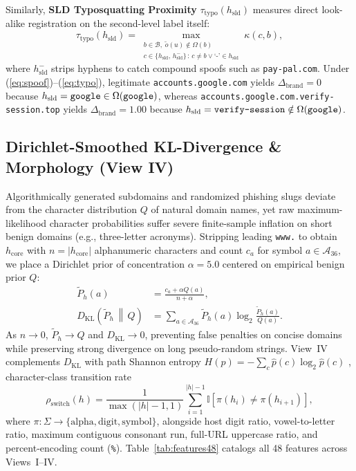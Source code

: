 \documentclass[conference]{IEEEtran}
\begin{document}
Similarly, \textbf{SLD Typosquatting Proximity} $\tau_{\text{typo}}(h_{\text{sld}})$ measures direct look-alike registration on the second-level label itself:
\begin{equation}
\tau_{\text{typo}}(h_{\text{sld}}) = \max_{\substack{b \in \mathcal{B},\; \tilde{o}(u) \notin \Omega(b) \\ c \in \{h_{\text{sld}},\, h_{\text{sld}}^{-}\} \,:\, c \neq b \lor \text{`-'}\in h_{\text{sld}}}} \kappa(c, b),
\label{eq:typo}
\end{equation}
where $h_{\text{sld}}^{-}$ strips hyphens to catch compound spoofs such as \texttt{pay-pal.com}. Under (\ref{eq:spoof})--(\ref{eq:typo}), legitimate \texttt{accounts.google.com} yields $\Delta_{\text{brand}}=0$ because $h_{\text{sld}}=\text{\texttt{google}} \in \Omega(\text{\texttt{google}})$, whereas \texttt{accounts.google.com.verify-session.top} yields $\Delta_{\text{brand}}=1.00$ because $h_{\text{sld}}=\text{\texttt{verify-session}} \notin \Omega(\text{\texttt{google}})$.

\subsection{Dirichlet-Smoothed KL-Divergence \& Morphology (View IV)}
Algorithmically generated subdomains and randomized phishing slugs deviate from the character distribution $Q$ of natural domain names, yet raw maximum-likelihood character probabilities suffer severe finite-sample inflation on short benign domains (e.g., three-letter acronyms). Stripping leading \texttt{www.} to obtain $h_{\text{core}}$ with $n = |h_{\text{core}}|$ alphanumeric characters and count $c_a$ for symbol $a \in \mathcal{A}_{36}$, we place a Dirichlet prior of concentration $\alpha = 5.0$ centered on empirical benign prior $Q$:
\begin{equation}
\begin{aligned}
\tilde{P}_{h}(a) &= \frac{c_a + \alpha Q(a)}{n + \alpha}, \\
D_{\text{KL}}\!\left(\tilde{P}_h \,\middle\|\, Q\right) &= \sum_{a \in \mathcal{A}_{36}} \tilde{P}_h(a) \log_2 \frac{\tilde{P}_h(a)}{Q(a)}.
\end{aligned}
\label{eq:kl}
\end{equation}
As $n \to 0$, $\tilde{P}_h \to Q$ and $D_{\text{KL}} \to 0$, preventing false penalties on concise domains while preserving strong divergence on long pseudo-random strings. View~IV complements $D_{\text{KL}}$ with path Shannon entropy $H(p) = -\sum_c \hat{p}(c)\log_2 \hat{p}(c)$ \cite{shannon1948}, character-class transition rate
\begin{equation}
\rho_{\text{switch}}(h) = \frac{1}{\max(|h|-1, 1)} \sum_{i=1}^{|h|-1} \mathbb{I}\!\left[\pi(h_i) \neq \pi(h_{i+1})\right],
\label{eq:switch}
\end{equation}
where $\pi: \Sigma \to \{\text{alpha}, \text{digit}, \text{symbol}\}$, alongside host digit ratio, vowel-to-letter ratio, maximum contiguous consonant run, full-URL uppercase ratio, and percent-encoding count (\texttt{\%}). Table~\ref{tab:features48} catalogs all 48 features across Views~I--IV.
\end{document}
